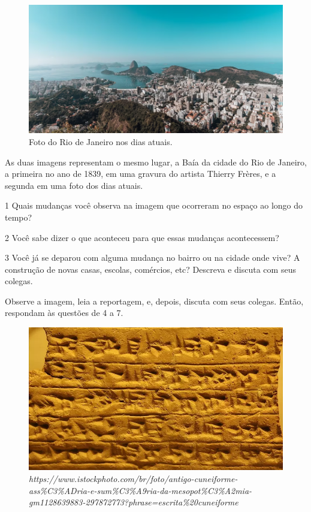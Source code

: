 \begin{itemize}
\begin{figure}[htpb!]
\includegraphics[width=.5\textwidth]{./imgs/img30.png}
\caption{Foto do Rio de Janeiro nos dias atuais.}
\end{figure}


As duas imagens representam o mesmo lugar, a Baía da cidade do Rio de
Janeiro, a primeira no ano de 1839, em uma gravura do artista Thierry
Frères, e a segunda em uma foto dos dias atuais.

\num{1} Quais mudanças você observa na imagem que ocorreram no espaço ao longo
do tempo? 


\num{2} Você sabe dizer o que aconteceu para que essas mudanças acontecessem?


\num{3} Você já se deparou com alguma mudança no bairro ou na cidade onde vive?
A construção de novas casas, escolas, comércios, etc? Descreva e discuta
com seus colegas.


Observe a imagem, leia a reportagem, e, depois, discuta com seus colegas. Então, respondam às questões de 4 a 7.


\begin{figure}[htpb!]
\includegraphics[width=.5\textwidth]{./imgs/img31.png}
\caption{\emph{https://www.istockphoto.com/br/foto/antigo-cuneiforme-ass\%C3\%ADria-e-sum\%C3\%A9ria-da-mesopot\%C3\%A2mia-gm1128639883-297872773?phrase=escrita\%20cuneiforme}}
\end{figure}


\end{itemize}
